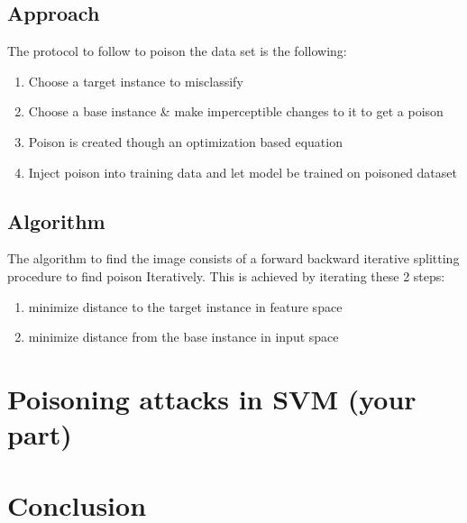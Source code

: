 \documentclass{article}
\begin{document}
\subsection{Approach}
The protocol to follow to poison the data set is the following:

\begin{enumerate}
  \item Choose a target instance to misclassify
  \item Choose a base instance \& make imperceptible changes to it to get a poison
  \item Poison is created though an optimization based equation
  \item Inject poison into training data and let model be trained on poisoned dataset
\end{enumerate}

\subsection{Algorithm}
The algorithm to find the image consists of a forward backward iterative splitting procedure to find poison Iteratively. This is achieved by iterating these 2 steps:



\begin{enumerate}
  \item minimize distance to the target instance in feature space
  \item minimize distance from the base instance  in input space
\end{enumerate}

\section{Poisoning attacks in SVM (your part) }
\section*{Conclusion}
\end{document}

